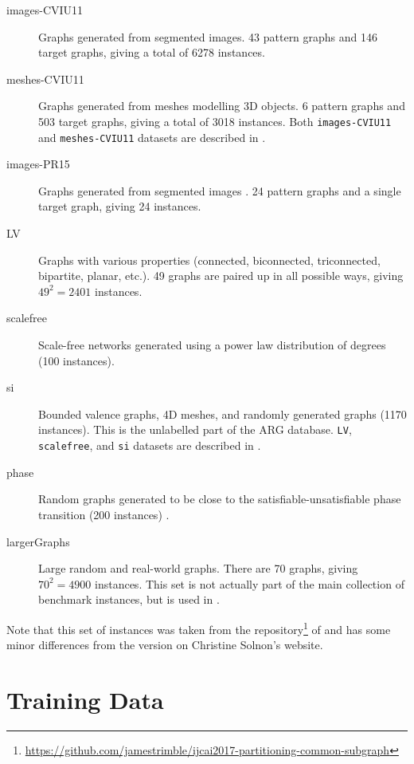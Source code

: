 \documentclass{article}
\theoremstyle{definition}
\begin{document}
\begin{description}
\item[images-CVIU11] Graphs generated from segmented images. 43 pattern graphs
  and 146 target graphs, giving a total of 6278 instances.
\item[meshes-CVIU11] Graphs generated from meshes modelling 3D
  objects. 6 pattern graphs and 503 target graphs, giving a total of 3018
  instances. Both \texttt{images-CVIU11} and \texttt{meshes-CVIU11} datasets are
  described in \cite{DBLP:journals/cviu/DamiandSHJS11}.
\item[images-PR15] Graphs generated from segmented images
  \cite{DBLP:journals/pr/SolnonDHJ15}. 24 pattern graphs and a single target
  graph, giving 24 instances.
\item[LV] Graphs with various properties (connected, biconnected, triconnected,
  bipartite, planar, etc.). 49 graphs are paired up in all possible ways, giving
  $49^2=2401$ instances.
\item[scalefree] Scale-free networks generated using a power law distribution of
  degrees (100 instances).
\item[si] Bounded valence graphs, 4D meshes, and randomly generated graphs (1170
  instances). This is the unlabelled part of the ARG database. \texttt{LV},
  \texttt{scalefree}, and \texttt{si} datasets are described in
  \cite{DBLP:journals/ai/Solnon10, DBLP:journals/constraints/ZampelliDS10}.
\item[phase] Random graphs generated to be close to the
  satisfiable-unsatisfiable phase transition (200 instances)
  \cite{DBLP:conf/ijcai/McCreeshPT16}.
\item[largerGraphs] Large random and real-world graphs. There are 70 graphs,
  giving $70^2=4900$ instances. This set is not actually part of the main
  collection of benchmark instances, but is used in
  \cite{DBLP:conf/aaai/HoffmannMR17, DBLP:conf/lion/KotthoffMS16,
    DBLP:conf/ijcai/McCreeshPT17}.
\end{description}

Note that this set of instances was taken from the
repository\footnote{\url{https://github.com/jamestrimble/ijcai2017-partitioning-common-subgraph}}
of \cite{DBLP:conf/ijcai/McCreeshPT17} and has some minor differences from the
version on Christine Solnon's website.

\section{Training Data}
\end{document}
